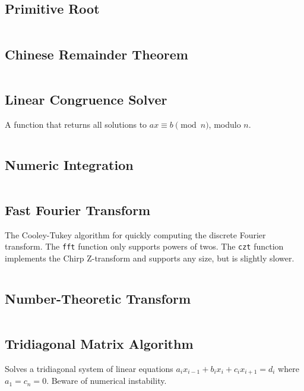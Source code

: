 \documentclass[9pt,a4paper,twocolumn,landscape,oneside]{amsart}
\newcommand{\code}[1]{\inputminted{cpp}{_code/#1}}
\newif\ifverbose
\begin{document}
    \ifverbose
    \subsection{Modular Exponentiation}
        A function to perform fast modular exponentiation.
        \code{mathematics/mod_pow.cpp}
    \fi

    \subsection{Primitive Root}
        \code{mathematics/primitive_root.cpp}

    \subsection{Chinese Remainder Theorem}
        \ifverbose
        An implementation of the Chinese Remainder Theorem.
        \fi
        \code{mathematics/crt.cpp}

    \subsection{Linear Congruence Solver}
        A function that returns all solutions to $ax \equiv b \pmod{n}$, modulo $n$.
        \code{mathematics/linear_congruence.cpp}

    \subsection{Numeric Integration}
        \ifverbose
        Numeric integration using Simpson's rule.
        \fi
        \code{mathematics/numeric_integration.cpp}

    \subsection{Fast Fourier Transform}
        The Cooley-Tukey algorithm for quickly computing the discrete Fourier
        transform. The \texttt{fft} function only supports powers of twos. The
        \texttt{czt} function implements the Chirp Z-transform and supports any
        size, but is slightly slower.
        \code{mathematics/fft.cpp}
    \subsection{Number-Theoretic Transform}
        \code{mathematics/ntt.cpp}

    \subsection{Tridiagonal Matrix Algorithm}
        Solves a tridiagonal system of linear equations $a_ix_{i-1} + b_ix_i +
        c_ix_{i+1} = d_i$ where $a_1 = c_n = 0$. Beware of numerical
        instability.
        \code{mathematics/tridiagonal.cpp}
\end{document}
